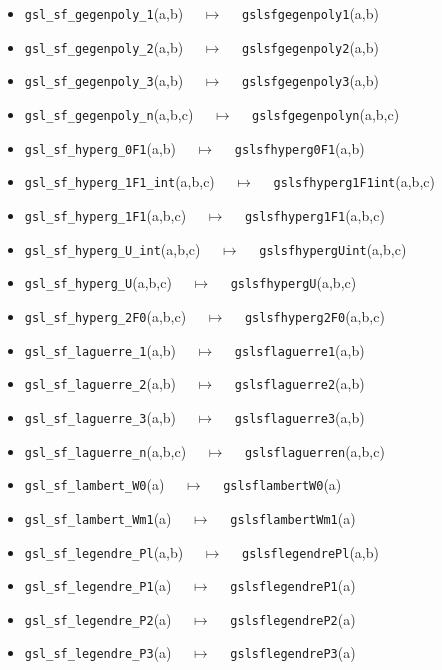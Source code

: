 \documentclass[a4paper,twoside,12pt]{book}
\begin{document}
{\begin{itemize}
\item \texttt{gsl\_sf\_gegenpoly\_1}(a,b) $\quad \mapsto\quad $ \texttt{gslsfgegenpoly1}(a,b) 
\item \texttt{gsl\_sf\_gegenpoly\_2}(a,b) $\quad \mapsto\quad $ \texttt{gslsfgegenpoly2}(a,b) 
\item \texttt{gsl\_sf\_gegenpoly\_3}(a,b) $\quad \mapsto\quad $ \texttt{gslsfgegenpoly3}(a,b) 
\item \texttt{gsl\_sf\_gegenpoly\_n}(a,b,c) $\quad \mapsto\quad $ \texttt{gslsfgegenpolyn}(a,b,c) 
\item \texttt{gsl\_sf\_hyperg\_0F1}(a,b) $\quad \mapsto\quad $ \texttt{gslsfhyperg0F1}(a,b) 
\item \texttt{gsl\_sf\_hyperg\_1F1\_int}(a,b,c) $\quad \mapsto\quad $ \texttt{gslsfhyperg1F1int}(a,b,c) 
\item \texttt{gsl\_sf\_hyperg\_1F1}(a,b,c) $\quad \mapsto\quad $ \texttt{gslsfhyperg1F1}(a,b,c) 
\item \texttt{gsl\_sf\_hyperg\_U\_int}(a,b,c) $\quad \mapsto\quad $ \texttt{gslsfhypergUint}(a,b,c) 
\item \texttt{gsl\_sf\_hyperg\_U}(a,b,c) $\quad \mapsto\quad $ \texttt{gslsfhypergU}(a,b,c) 
\item \texttt{gsl\_sf\_hyperg\_2F0}(a,b,c) $\quad \mapsto\quad $ \texttt{gslsfhyperg2F0}(a,b,c) 
\item \texttt{gsl\_sf\_laguerre\_1}(a,b) $\quad \mapsto\quad $ \texttt{gslsflaguerre1}(a,b) 
\item \texttt{gsl\_sf\_laguerre\_2}(a,b) $\quad \mapsto\quad $ \texttt{gslsflaguerre2}(a,b) 
\item \texttt{gsl\_sf\_laguerre\_3}(a,b) $\quad \mapsto\quad $ \texttt{gslsflaguerre3}(a,b) 
\item \texttt{gsl\_sf\_laguerre\_n}(a,b,c) $\quad \mapsto\quad $ \texttt{gslsflaguerren}(a,b,c) 
\item \texttt{gsl\_sf\_lambert\_W0}(a) $\quad \mapsto\quad $ \texttt{gslsflambertW0}(a) 
\item \texttt{gsl\_sf\_lambert\_Wm1}(a) $\quad \mapsto\quad $ \texttt{gslsflambertWm1}(a) 
\item \texttt{gsl\_sf\_legendre\_Pl}(a,b) $\quad \mapsto\quad $ \texttt{gslsflegendrePl}(a,b) 
\item \texttt{gsl\_sf\_legendre\_P1}(a) $\quad \mapsto\quad $ \texttt{gslsflegendreP1}(a) 
\item \texttt{gsl\_sf\_legendre\_P2}(a) $\quad \mapsto\quad $ \texttt{gslsflegendreP2}(a) 
\item \texttt{gsl\_sf\_legendre\_P3}(a) $\quad \mapsto\quad $ \texttt{gslsflegendreP3}(a) 

\end{itemize}}
\end{document}

